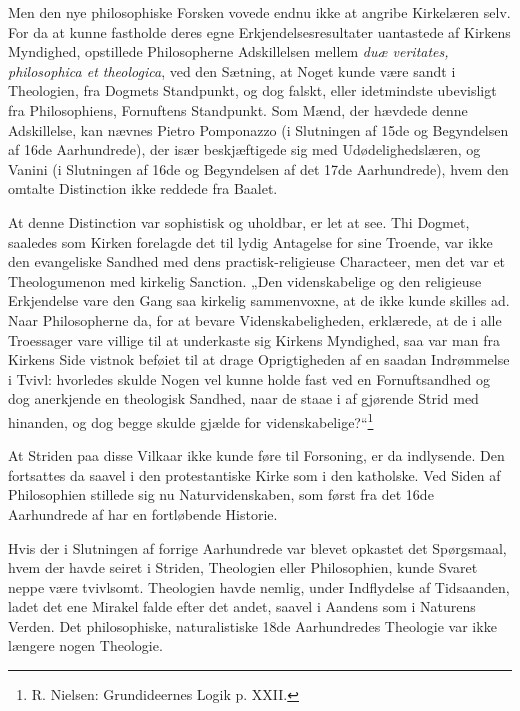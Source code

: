 \documentclass[12pt,a4paper]{book}
\newcommand{\opage}[1]{\marginnote{\footnotesize\textit{[#1]}}}
\begin{document}
Men den nye philosophiske Forsken vovede endnu ikke at angribe Kirkelæren
selv. For da at kunne fastholde deres egne Erkjendelsesresultater uantastede
af Kirkens Myndighed, opstillede Philosopherne Adskillelsen mellem
\textit{duæ veritates, philosophica et theologica}, ved den Sætning, at
Noget kunde være sandt i Theologien, fra Dogmets Standpunkt, og dog falskt,
eller idetmindste ubevisligt fra Philosophiens, Fornuftens Standpunkt. Som
Mænd, der hævdede denne Adskillelse, kan nævnes Pietro Pomponazzo (i
Slutningen af 15de og Begyndelsen af 16de Aarhundrede), der især
beskjæftigede sig med Udødelighedslæren, og Vanini (i Slutningen af 16de og
Begyndelsen af det 17de Aarhundrede), hvem den omtalte Distinction ikke
reddede fra Baalet.

At denne Distinction var sophistisk og uholdbar, er let at see. Thi Dogmet,
saaledes som Kirken forelagde det til lydig Antagelse for sine Troende, var
ikke den evangeliske Sandhed med dens practisk-religieuse Characteer, men det
var et Theologumenon med kirkelig Sanction. „Den videnskabelige og den
religieuse Erkjendelse vare den Gang saa kirkelig sammenvoxne, at de ikke
kunde skilles ad. Naar Philosopherne da, for at bevare Videnskabeligheden,
erklærede, at de i alle Troessager vare villige til at underkaste sig
Kirkens Myndighed, saa var man fra Kirkens Side vistnok beføiet til at drage
Oprigtigheden af en saadan Indrømmelse i Tvivl: hvorledes skulde Nogen vel
kunne holde fast ved en Fornuftsandhed og dog anerkjende en theologisk
Sandhed, naar de staae i af%
\opage{14}\setcounter{footnote}{0}%
gjørende Strid med hinanden, og dog begge skulde gjælde for
videnskabelige?“\footnote{R. Nielsen: Grundideernes Logik p. XXII.}

At Striden paa disse Vilkaar ikke kunde føre til Forsoning, er da
indlysende. Den fortsattes da saavel i den protestantiske Kirke som i den
katholske. Ved Siden af Philosophien stillede sig nu Naturvidenskaben, som
først fra det 16de Aarhundrede af har en fortløbende Historie.

Hvis der i Slutningen af forrige Aarhundrede var blevet opkastet det
Spørgsmaal, hvem der havde seiret i Striden, Theologien eller Philosophien,
kunde Svaret neppe være tvivlsomt. Theologien havde nemlig, under
Indflydelse af Tidsaanden, ladet det ene Mirakel falde efter det andet,
saavel i Aandens som i Naturens Verden. Det philosophiske, naturalistiske
18de Aarhundredes Theologie var ikke længere nogen Theologie.
\end{document}
